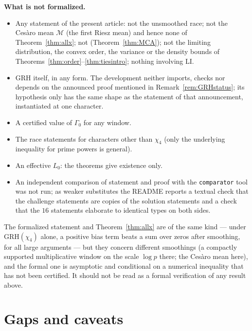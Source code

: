 \documentclass[11pt]{amsart}
\theoremstyle{definition}
\numberwithin{equation}{section}
\newcommand{\cM}{\mathcal M}          %
\begin{document}
\medskip\noindent\textbf{What is not formalized.}
\begin{itemize}
\item Any statement of the present article: not the unsmoothed race;
not the Ces\`aro mean $\cM$ (the first Riesz mean) and hence none of
Theorem~\ref{thm:allx}; not \cite[Theorem~A]{MC}
(Theorem~\ref{thm:MCA}); not the limiting distribution, the convex
order, the variance or the density bounds of
Theorems~\ref{thm:order}--\ref{thm:tiesintro}; nothing involving LI.
\item GRH itself, in any form. The development neither imports,
checks nor depends on the announced proof mentioned in
Remark~\ref{rem:GRHstatus}; its hypothesis only has the same shape as
the statement of that announcement, instantiated at one character.
\item A certified value of $\Gamma_0$ for any window.
\item The race statements for characters other than $\chi_4$ (only
the underlying inequality for prime powers is general).
\item An effective $L_0$: the theorems give existence only.
\item An independent comparison of statement and proof with the
\texttt{comparator} tool was not run; as weaker substitutes the
README reports a textual check that the challenge statements are
copies of the solution statements and a check that the $16$
statements elaborate to identical types on both sides.
\end{itemize}
The formalized statement and Theorem~\ref{thm:allx} are of the same
kind --- under GRH$(\chi_4)$ alone, a positive bias term beats a sum
over zeros after smoothing, for all large arguments --- but they
concern different smoothings (a compactly supported multiplicative
window on the scale $\log p$ there; the Ces\`aro mean here), and the
formal one is asymptotic and conditional on a numerical inequality
that has not been certified. It should not be read as a formal
verification of any result above.

\section{Gaps and caveats}\label{sec:gaps}
\end{document}
